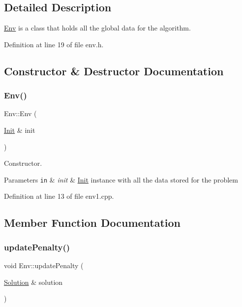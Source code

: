 \subsection{Detailed Description}
\hyperlink{class_env}{Env} is a class that holds all the global data for the algorithm. 

Definition at line 19 of file env.\+h.



\subsection{Constructor \& Destructor Documentation}
\mbox{\label{class_env_abef807205f56ffe87706b5413c0de75f}} 
\subsubsection{\texorpdfstring{Env()}{Env()}}
{\footnotesize\ttfamily Env\+::\+Env (\begin{DoxyParamCaption}\item[{\hyperlink{class_init}{Init} \&}]{init }\end{DoxyParamCaption})}



Constructor. 


\begin{DoxyParams}[1]{Parameters}
\mbox{\tt in}  & {\em init} & \hyperlink{class_init}{Init} instance with all the data stored for the problem \\
\hline
\end{DoxyParams}


Definition at line 13 of file env1.\+cpp.



\subsection{Member Function Documentation}
\mbox{\label{class_env_a05decf6ad0f2370b38fd8c403777a9ca}} 
\subsubsection{\texorpdfstring{update\+Penalty()}{updatePenalty()}}
{\footnotesize\ttfamily void Env\+::update\+Penalty (\begin{DoxyParamCaption}\item[{\hyperlink{class_solution}{Solution} \&}]{solution }\end{DoxyParamCaption})}




